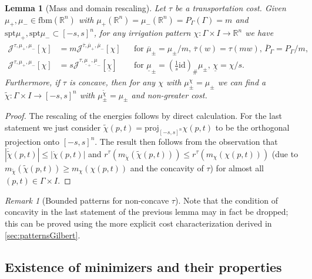 \documentclass[10pt,a4paper,oneside,final]{article}
\newcommand{\R}{{\mathbb{R}}}
\newcommand{\id}{\mathrm{id}}
\newcommand{\fbm}{{\mathrm{fbm}}}
\newcommand{\pushforward}[2]{{{#1}_{\#}#2}}
\newcommand{\spt}{{\mathrm{spt}}}
\newcommand{\reSpace}{\Gamma}
\newcommand{\reMeasure}{P_{\reSpace}}
\newcommand{\JEn}{{\mathcal{J}}}
\numberwithin{equation}{section}
\theoremstyle{plain}
\newtheorem{lemma}[theorem]{Lemma}
\theoremstyle{definition}
\theoremstyle{remark}
\newtheorem{remark}[theorem]{Remark}
\begin{document}
\begin{lemma}[Mass and domain rescaling]\label{thm:patternRescaling}
Let $\tau$ be a transportation cost.
Given $\mu_+,\mu_-\in\fbm(\R^n)$ with $\mu_+(\R^n)=\mu_-(\R^n)=\reMeasure(\reSpace)=m$ and $\spt\mu_+,\spt\mu_-\subset[-s,s]^n$, for any irrigation pattern $\chi:\reSpace\times I\to\R^n$ we have
\begin{align*}
\JEn^{\tau,\mu_+,\mu_-}[\chi]&=m\JEn^{\overline\tau,\overline\mu_+,\overline\mu_-}[\chi]
&&\text{for }\overline\mu_\pm=\mu_\pm/m,\,\overline\tau(w)=\tau(mw),\,\overline\reMeasure=\reMeasure/m,\\
\JEn^{\tau,\mu_+,\mu_-}[\chi]&=s\JEn^{\tau,\underline\mu_+,\underline\mu_-}[\underline\chi]
&&\text{for }\underline\mu_\pm=\pushforward{(\tfrac1s\id)}{\mu_\pm},\,\underline\chi=\chi/s.
\end{align*}
Furthermore, if $\tau$ is concave, then for any $\chi$ with $\mu_\pm^\chi=\mu_\pm$ we can find a $\tilde\chi:\reSpace\times I\to[-s,s]^n$ with $\mu_\pm^{\tilde\chi}=\mu_\pm$ and non-greater cost.
\end{lemma}
\begin{proof}
The rescaling of the energies follows by direct calculation.
For the last statement we just consider $\tilde\chi(p,t)=\mathrm{proj}_{[-s,s]^n}\chi(p,t)$ to be the orthogonal projection onto $[-s,s]^n$.
The result then follows from the observation that $|\dot{\tilde\chi}(p,t)|\leq|\dot\chi(p,t)|$
and $r^\tau(m_{\tilde\chi}(\tilde\chi(p,t)))\leq r^\tau(m_{\chi}(\chi(p,t)))$ (due to $m_{\tilde\chi}(\tilde\chi(p,t))\geq m_{\chi}(\chi(p,t))$ and the concavity of $\tau$) for almost all $(p,t)\in\reSpace\times I$.
\end{proof}

\begin{remark}[Bounded patterns for non-concave $\tau$]
Note that the condition of concavity in the last statement of the previous lemma may in fact be dropped;
this can be proved using the more explicit cost characterization derived in \cref{sec:patternsGilbert}.
\end{remark}

\subsection{Existence of minimizers and their properties}
\end{document}
